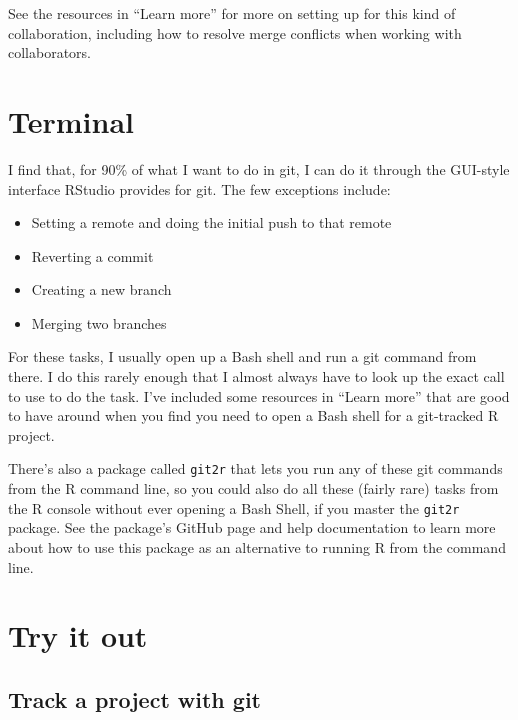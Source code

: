 \documentclass[]{tufte-book}
\providecommand{\tightlist}{%
  \setlength{\itemsep}{0pt}\setlength{\parskip}{0pt}}
\begin{document}
See the resources in ``Learn more'' for more on setting up for this kind of collaboration,
including how to resolve merge conflicts when working with collaborators.

\hypertarget{terminal}{%
\section{Terminal}\label{terminal}}

I find that, for 90\% of what I want to do in git, I can do it through the GUI-style
interface RStudio provides for git. The few exceptions include:

\begin{itemize}
\tightlist
\item
  Setting a remote and doing the initial push to that remote
\item
  Reverting a commit
\item
  Creating a new branch
\item
  Merging two branches
\end{itemize}

For these tasks, I usually open up a Bash shell and run a git command from
there. I do this rarely enough that I almost always have to look up the exact
call to use to do the task. I've included some resources in ``Learn more'' that
are good to have around when you find you need to open a Bash shell for a
git-tracked R project.

There's also a package called \texttt{git2r} that lets you run any of these git
commands from the R command line, so you could also do all these (fairly rare)
tasks from the R console without ever opening a Bash Shell, if you master the
\texttt{git2r} package. See the package's GitHub page and help documentation
to learn more about how to use this package as an alternative to running R from
the command line.

\hypertarget{try-it-out-1}{%
\section{Try it out}\label{try-it-out-1}}

\hypertarget{track-a-project-with-git}{%
\subsection{Track a project with git}\label{track-a-project-with-git}}
\end{document}
